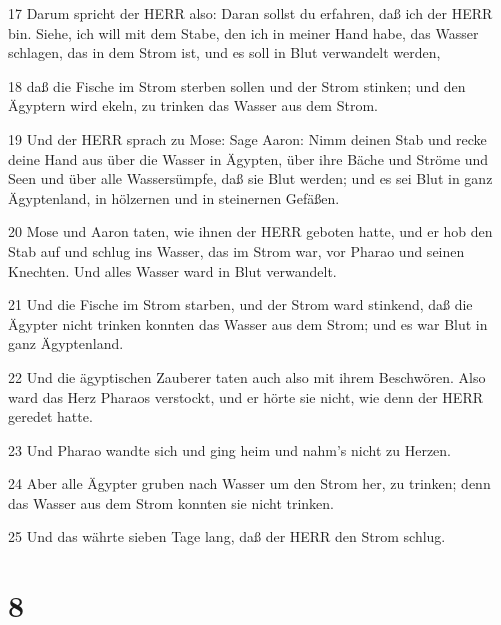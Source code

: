 \par 17 Darum spricht der HERR also: Daran sollst du erfahren, daß ich der HERR bin. Siehe, ich will mit dem Stabe, den ich in meiner Hand habe, das Wasser schlagen, das in dem Strom ist, und es soll in Blut verwandelt werden,
\par 18 daß die Fische im Strom sterben sollen und der Strom stinken; und den Ägyptern wird ekeln, zu trinken das Wasser aus dem Strom.
\par 19 Und der HERR sprach zu Mose: Sage Aaron: Nimm deinen Stab und recke deine Hand aus über die Wasser in Ägypten, über ihre Bäche und Ströme und Seen und über alle Wassersümpfe, daß sie Blut werden; und es sei Blut in ganz Ägyptenland, in hölzernen und in steinernen Gefäßen.
\par 20 Mose und Aaron taten, wie ihnen der HERR geboten hatte, und er hob den Stab auf und schlug ins Wasser, das im Strom war, vor Pharao und seinen Knechten. Und alles Wasser ward in Blut verwandelt.
\par 21 Und die Fische im Strom starben, und der Strom ward stinkend, daß die Ägypter nicht trinken konnten das Wasser aus dem Strom; und es war Blut in ganz Ägyptenland.
\par 22 Und die ägyptischen Zauberer taten auch also mit ihrem Beschwören. Also ward das Herz Pharaos verstockt, und er hörte sie nicht, wie denn der HERR geredet hatte.
\par 23 Und Pharao wandte sich und ging heim und nahm's nicht zu Herzen.
\par 24 Aber alle Ägypter gruben nach Wasser um den Strom her, zu trinken; denn das Wasser aus dem Strom konnten sie nicht trinken.
\par 25 Und das währte sieben Tage lang, daß der HERR den Strom schlug.

\chapter{8}

